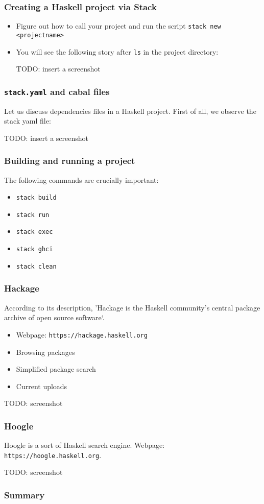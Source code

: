 \documentclass[10pt,pdf,utf8,russian,aspectratio=169]{beamer}
\begin{document}
\begin{frame}
  \frametitle{Creating a Haskell project via Stack}
  \begin{itemize}
    \item Figure out how to call your project and run the script \verb"stack new <projectname>"
    \item You will see the following story after \verb"ls" in the project directory:

    TODO: insert a screenshot
  \end{itemize}
\end{frame}

\begin{frame}
  \frametitle{\verb"stack.yaml" and cabal files}

  Let us discuss dependencies files in a Haskell project. First of all, we observe the stack yaml file:

  TODO: insert a screenshot
\end{frame}

\begin{frame}
  \frametitle{Building and running a project}

The following commands are crucially important:

  \begin{itemize}
    \item \verb"stack build"
    \item \verb"stack run"
    \item \verb"stack exec"
    \item \verb"stack ghci"
    \item \verb"stack clean"
  \end{itemize}
\end{frame}

\begin{frame}
  \frametitle{Hackage}

  According to its description, 'Hackage is the Haskell community's central package archive of open source software`.

  \begin{itemize}
    \item Webpage: \verb"https://hackage.haskell.org"
    \item Browsing packages
    \item Simplified package search
    \item Current uploads
  \end{itemize}

  TODO: screenshot
\end{frame}

\begin{frame}
  \frametitle{Hoogle}

  Hoogle is a sort of Haskell search engine. Webpage: \verb"https://hoogle.haskell.org".

  TODO: screenshot
\end{frame}

\begin{frame}
  \frametitle{Summary}
\end{frame}
\end{document}

